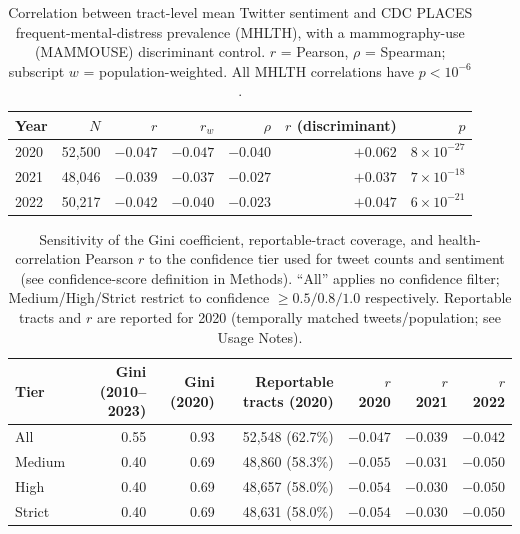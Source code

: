 \documentclass[fleqn,10pt]{wlscirep}
\begin{document}
\begin{table}[htbp]
\centering
\caption{Correlation between tract-level mean Twitter sentiment and CDC PLACES frequent-mental-distress prevalence (MHLTH), with a mammography-use (MAMMOUSE) discriminant control. $r$ = Pearson, $\rho$ = Spearman; subscript $w$ = population-weighted. All MHLTH correlations have $p < 10^{-6}$.}
\label{tab:correlation}
\begin{tabular}{lrrrrrr}
\toprule
Year & $N$ & $r$ & $r_w$ & $\rho$ & $r$ (discriminant) & $p$ \\
\midrule
2020 & 52,500 & $-0.047$ & $-0.047$ & $-0.040$ & $+0.062$ & $8\times10^{-27}$ \\
2021 & 48,046 & $-0.039$ & $-0.037$ & $-0.027$ & $+0.037$ & $7\times10^{-18}$ \\
2022 & 50,217 & $-0.042$ & $-0.040$ & $-0.023$ & $+0.047$ & $6\times10^{-21}$ \\
\bottomrule
\end{tabular}
\end{table}

\begin{table}[htbp]
\centering
\caption{Sensitivity of the Gini coefficient, reportable-tract coverage, and health-correlation Pearson $r$ to the confidence tier used for tweet counts and sentiment (see confidence-score definition in Methods). ``All'' applies no confidence filter; Medium/High/Strict restrict to confidence $\ge 0.5/0.8/1.0$ respectively. Reportable tracts and $r$ are reported for 2020 (temporally matched tweets/population; see Usage Notes).}
\label{tab:tier_sensitivity}
\begin{tabular}{lrrrrrr}
\toprule
Tier & Gini (2010--2023) & Gini (2020) & Reportable tracts (2020) & $r$ 2020 & $r$ 2021 & $r$ 2022 \\
\midrule
All    & 0.55 & 0.93 & 52,548 (62.7\%) & $-0.047$ & $-0.039$ & $-0.042$ \\
Medium & 0.40 & 0.69 & 48,860 (58.3\%) & $-0.055$ & $-0.031$ & $-0.050$ \\
High   & 0.40 & 0.69 & 48,657 (58.0\%) & $-0.054$ & $-0.030$ & $-0.050$ \\
Strict & 0.40 & 0.69 & 48,631 (58.0\%) & $-0.054$ & $-0.030$ & $-0.050$ \\
\bottomrule
\end{tabular}
\end{table}
\end{document}

